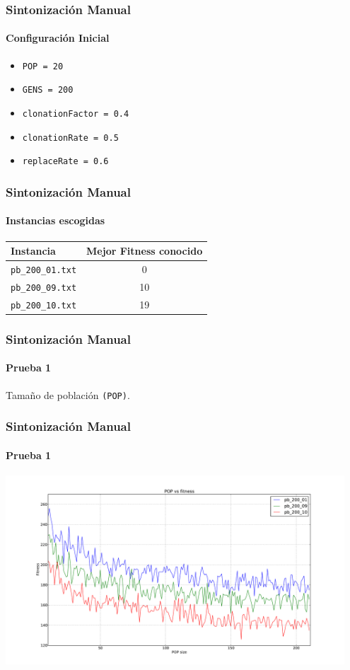 \frame
{
\frametitle{Sintonización Manual}
\framesubtitle{Configuración Inicial}
\begin{itemize}
    \item \texttt{POP = 20}
    \item \texttt{GENS = 200}
    \item \texttt{clonationFactor = 0.4}
    \item \texttt{clonationRate = 0.5}
    \item \texttt{replaceRate = 0.6}
\end{itemize}

}

\frame
{
\frametitle{Sintonización Manual}
\framesubtitle{Instancias escogidas}
\begin{center}
    \begin{tabular}{|l|c|}
    \hline
    \textbf{Instancia} & \textbf{Mejor Fitness conocido} \\\hline
    \texttt{pb\_200\_01.txt} & 0 \\\hline
    \texttt{pb\_200\_09.txt} & 10 \\\hline
    \texttt{pb\_200\_10.txt} & 19 \\\hline
    \end{tabular}
\end{center}
}

\frame
{
\frametitle{Sintonización Manual}
\framesubtitle{Prueba 1}
\vspace{1cm}
\begin{center}
    Tamaño de población \texttt{(POP)}.\\
\end{center}
}

\frame
{
\frametitle{Sintonización Manual}
\framesubtitle{Prueba 1}
\begin{center}
    \includegraphics[width=0.95\textwidth]{../doc/img/1.pdf}
\end{center}
}

